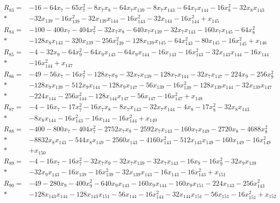 \begin{align*}
R_{83}={}&-16-64x_{7}-65x_{7}^{2}-8x_{7}x_{8}-64x_{7}x_{139}-8x_{7}x_{143}-64x_{7}x_{144}-16x_{8}^{2}-32x_{8}x_{143}\\*
&-32x_{139}-16x_{139}^{2}-32x_{139}x_{144}-16x_{143}^{2}-32x_{144}-16x_{144}^{2}+x_{145}\\[3pt]
R_{84}={}&-100-400x_{7}-404x_{7}^{2}-32x_{7}x_{8}-640x_{7}x_{139}-32x_{7}x_{143}-160x_{7}x_{145}-64x_{8}^{2}\\*
&-128x_{8}x_{143}-320x_{139}-256x_{139}^{2}-128x_{139}x_{145}-64x_{143}^{2}-80x_{145}-16x_{145}^{2}+x_{146}\\[3pt]
R_{85}={}&-4-32x_{9}-64x_{9}^{2}-64x_{9}x_{143}-64x_{9}x_{144}-16x_{143}-16x_{143}^{2}-32x_{143}x_{144}-16x_{144}\\*
&-16x_{144}^{2}+x_{147}\\[3pt]
R_{86}={}&-49-56x_{7}-16x_{7}^{2}-128x_{7}x_{9}-32x_{7}x_{139}-128x_{7}x_{144}-32x_{7}x_{147}-224x_{9}-256x_{9}^{2}\\*
&-128x_{9}x_{139}-512x_{9}x_{144}-128x_{9}x_{147}-56x_{139}-16x_{139}^{2}-128x_{139}x_{144}-32x_{139}x_{147}\\*
&-224x_{144}-256x_{144}^{2}-128x_{144}x_{147}-56x_{147}-16x_{147}^{2}+x_{148}\\[3pt]
R_{87}={}&-4-16x_{7}-17x_{7}^{2}-16x_{7}x_{8}-8x_{7}x_{143}-32x_{7}x_{144}-4x_{8}-17x_{8}^{2}-32x_{8}x_{143}\\*
&-8x_{8}x_{144}-16x_{143}^{2}-16x_{144}-16x_{144}^{2}+x_{149}\\[3pt]
R_{88}={}&-400-800x_{7}-404x_{7}^{2}-2752x_{7}x_{8}-2592x_{7}x_{143}-160x_{7}x_{149}-2720x_{8}-4688x_{8}^{2}\\*
&-8832x_{8}x_{143}-544x_{8}x_{149}-2560x_{143}-4160x_{143}^{2}-512x_{143}x_{149}-160x_{149}-16x_{149}^{2}\\*
&+x_{150}\\[3pt]
R_{89}={}&-4-16x_{7}-16x_{7}^{2}-32x_{7}x_{9}-32x_{7}x_{139}-32x_{7}x_{143}-16x_{9}-16x_{9}^{2}-32x_{9}x_{139}\\*
&-32x_{9}x_{143}-16x_{139}-16x_{139}^{2}-32x_{139}x_{143}-16x_{143}-16x_{143}^{2}+x_{151}\\[3pt]
R_{90}={}&-49-280x_{9}-400x_{9}^{2}-640x_{9}x_{143}-160x_{9}x_{144}-160x_{9}x_{151}-224x_{143}-256x_{143}^{2}\\*
&-128x_{143}x_{144}-128x_{143}x_{151}-56x_{144}-16x_{144}^{2}-32x_{144}x_{151}-56x_{151}-16x_{151}^{2}+x_{152}\\[3pt]

\end{align*}
